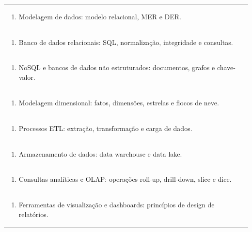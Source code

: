 \documentclass[11pt]{article}
\begin{document}
\begin{center}
\begin{longtable}{|p{4cm}|p{4cm}|p{4cm}|p{4cm}|}
\multicolumn{4}{|p{\dimexpr 16cm + 6\tabcolsep\relax}|}{\begin{enumerate}[start=2]\item Modelagem de dados: modelo relacional, MER e DER.\end{enumerate}}\\
\multicolumn{4}{|p{\dimexpr 16cm + 6\tabcolsep\relax}|}{\begin{enumerate}[start=3]\item Banco de dados relacionais: SQL, normalização, integridade e consultas.\end{enumerate}}\\
\multicolumn{4}{|p{\dimexpr 16cm + 6\tabcolsep\relax}|}{\begin{enumerate}[start=4]\item NoSQL e bancos de dados não estruturados: documentos, grafos e chave-valor.\end{enumerate}}\\
\multicolumn{4}{|p{\dimexpr 16cm + 6\tabcolsep\relax}|}{\begin{enumerate}[start=5]\item Modelagem dimensional: fatos, dimensões, estrelas e flocos de neve.\end{enumerate}}\\
\multicolumn{4}{|p{\dimexpr 16cm + 6\tabcolsep\relax}|}{\begin{enumerate}[start=6]\item Processos ETL: extração, transformação e carga de dados.\end{enumerate}}\\
\multicolumn{4}{|p{\dimexpr 16cm + 6\tabcolsep\relax}|}{\begin{enumerate}[start=7]\item Armazenamento de dados: data warehouse e data lake.\end{enumerate}}\\
\multicolumn{4}{|p{\dimexpr 16cm + 6\tabcolsep\relax}|}{\begin{enumerate}[start=8]\item Consultas analíticas e OLAP: operações roll-up, drill-down, slice e dice.\end{enumerate}}\\
\multicolumn{4}{|p{\dimexpr 16cm + 6\tabcolsep\relax}|}{\begin{enumerate}[start=9]\item Ferramentas de visualização e dashboards: princípios de design de relatórios.\end{enumerate}}\\

\end{longtable}
\end{center}
\end{document}
